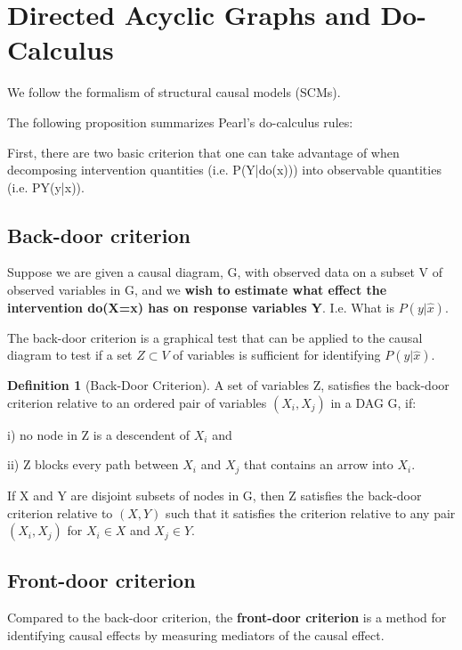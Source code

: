 \documentclass[class=article, crop=false]{standalone}
\theoremstyle{definition}
\newtheorem{definition}{Definition}[section]
\theoremstyle{remark}
\theoremstyle{lemma}
\theoremstyle{theorem}
\theoremstyle{corollary}
\theoremstyle{property}
\begin{document}
\section{Directed Acyclic Graphs and Do-Calculus}
	We follow the formalism of structural causal models (SCMs). 


	The following proposition summarizes Pearl's do-calculus rules:

	First, there are two basic criterion that one can take advantage of when decomposing intervention quantities (i.e. P(Y|do(x)))  into observable quantities (i.e. PY(y|x)).

	\subsection{Back-door criterion}
		Suppose we are given a causal diagram, G, with observed data on a subset V of observed variables in G, and we \textbf{wish to estimate what effect the intervention do(X=x) has on response variables Y}. I.e. What is $P(y|\hat{x})$.

		The back-door criterion is a graphical test that can be applied to the causal diagram to test if a set $Z \subset V$ of variables is sufficient for identifying $P(y | \hat{x})$.

		\begin{definition} [Back-Door Criterion]
			A set of variables Z, satisfies the back-door criterion relative to an ordered pair of variables $(X_i, X_j)$ in a DAG G, if:

			i) no node in Z is a descendent of $X_i$ and

			ii) Z blocks every path between $X_i$ and $X_j$ that contains an arrow into $X_i$.

			If X and Y are disjoint subsets of nodes in G, then Z satisfies the back-door criterion relative to $(X,Y)$ such that it satisfies the criterion relative to any pair $(X_i, X_j)$ for $X_i \in X$ and $X_j \in Y$.
		\end{definition}

	\subsection{Front-door criterion}
		Compared to the back-door criterion, the \textbf{front-door criterion} is a method for identifying causal effects by measuring mediators of the causal effect. 
\end{document}
